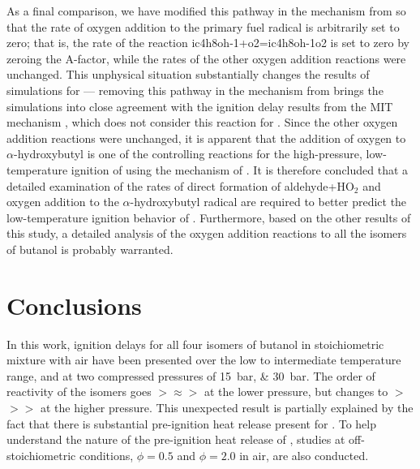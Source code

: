 \documentclass[12pt, letterpaper]{article}
\begin{document}
As a final comparison, we have modified this pathway in the mechanism from
\textcite{Sarathy2012} so that the rate of oxygen addition to the primary
fuel radical is arbitrarily set to zero; that is, the rate of the reaction
ic4h8oh-1+o2=ic4h8oh-1o2 is set to zero by zeroing the $\mathrm{A}$-factor, while the
rates of the other oxygen addition reactions were unchanged. This unphysical
situation substantially changes the results of simulations for
\iBuOH{} --- removing this pathway in the mechanism from
\textcite{Sarathy2012} brings the simulations into close agreement with the
ignition delay results from the MIT mechanism \cite{Hansen2013,Merchant2013},
which does not consider this reaction for \iBuOH{}. Since the other
oxygen addition reactions were unchanged, it is apparent that the addition of
oxygen to $\alpha$-hydroxybutyl is one of the controlling reactions for the
high-pressure, low-temperature ignition of \iBuOH{} using the
mechanism of \textcite{Sarathy2012}. It is therefore concluded that a detailed
examination of the rates of direct formation of aldehyde+HO$_2$ and oxygen
addition to the $\alpha$-hydroxybutyl radical are required to better predict
the low-temperature ignition behavior of \iBuOH{}. Furthermore, based
on the other results of this study, a detailed analysis of the oxygen addition
reactions to all the isomers of butanol is probably warranted.

\section{Conclusions}
\label{sec:buoh-conclusions}

In this work, ignition delays for all four isomers of butanol in stoichiometric
mixture with air have been presented over the low to intermediate temperature
range, and at two compressed pressures of \SIlist{15;30}{\bar}. The order of
reactivity of the isomers goes \nBuOH{}$>$\sBuOH{}$\approx$\iBuOH{}$>$\tBuOH{}
at the lower pressure, but changes to \nBuOH{}$>$\tBuOH{}$>$\sBuOH{}$>$\iBuOH{}
at the higher pressure. This unexpected result is partially explained by
the fact that there is substantial pre-ignition heat release present
for \tBuOH{}. To help understand the nature of the pre-ignition heat
release of \tBuOH{}, studies at off-stoichiometric conditions,
$\phi=\num{0.5}$ and $\phi=\num{2.0}$ in air, are also conducted.
\end{document}
